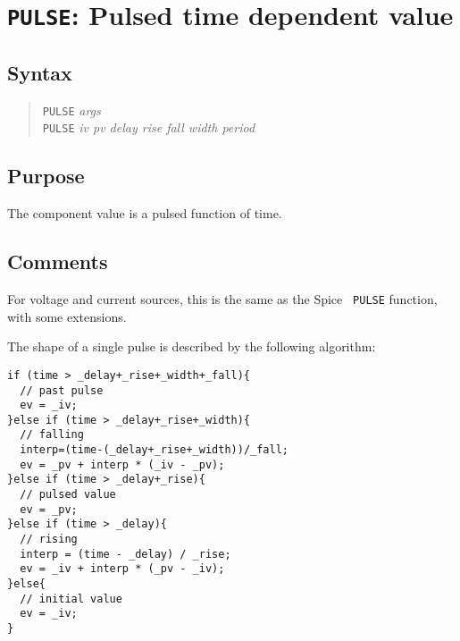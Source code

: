 %
%
%
%
\section{{\tt PULSE}: Pulsed time dependent value}
\subsection{Syntax}
\begin{verse}
{\tt PULSE} {\it args}\\
{\tt PULSE} {\it iv pv delay rise fall width period}
\end{verse}
\subsection{Purpose}

The component value is a pulsed function of time.
\subsection{Comments}

For voltage and current sources, this is the same as the Spice {\tt
PULSE} function, with some extensions.

The shape of a single pulse is described by the following algorithm:

\begin{verbatim}
if (time > _delay+_rise+_width+_fall){
  // past pulse
  ev = _iv;
}else if (time > _delay+_rise+_width){
  // falling
  interp=(time-(_delay+_rise+_width))/_fall;
  ev = _pv + interp * (_iv - _pv);
}else if (time > _delay+_rise){
  // pulsed value
  ev = _pv;
}else if (time > _delay){
  // rising
  interp = (time - _delay) / _rise;
  ev = _iv + interp * (_pv - _iv);
}else{
  // initial value
  ev = _iv;
}
\end{verbatim}

